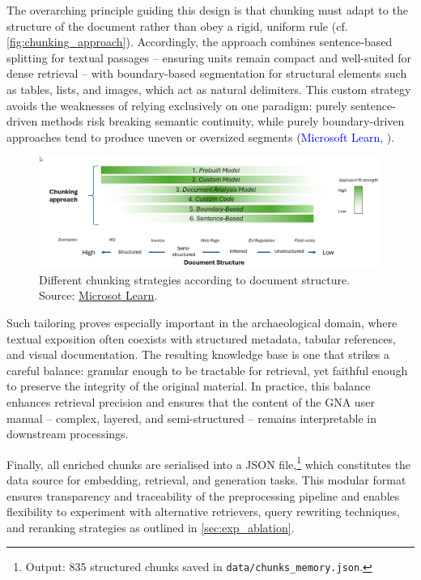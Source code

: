 \begin{spacing}{1.5}
The overarching principle guiding this design is that chunking must adapt to the structure of the document rather than obey a rigid, uniform rule (cf. \autoref{fig:chunking_approach}). Accordingly, the approach combines sentence-based splitting for textual passages -- ensuring units remain compact and well-suited for dense retrieval -- with boundary-based segmentation for structural elements such as tables, lists, and images, which act as natural delimiters. This custom strategy avoids the weaknesses of relying exclusively on one paradigm: purely sentence-driven methods risk breaking semantic continuity, while purely boundary-driven approaches tend to produce uneven or oversized segments (\textcolor{blue}{Microsoft Learn,} \citeyear{noauthor_develop_2025}).

\vspace{0.8em}
\begin{figure}[H]
  \centering
  \includegraphics[width=\textwidth]{images/chunking-approaches-by-document-structure.png} 
  \caption{Different chunking strategies according to document structure.\\
  \footnotesize{Source: \href{https://web.archive.org/web/20250825093743/https://learn.microsoft.com/en-us/azure/architecture/ai-ml/guide/rag/rag-chunking-phase}{Microsot Learn}}.}
  \label{fig:chunking_approach}
\end{figure}

Such tailoring proves especially important in the archaeological domain, where textual exposition often coexists with structured metadata, tabular references, and visual documentation. The resulting knowledge base is one that strikes a careful balance: granular enough to be tractable for retrieval, yet faithful enough to preserve the integrity of the original material. In practice, this balance enhances retrieval precision and ensures that the content of the GNA user manual -- complex, layered, and semi-structured -- remains interpretable in downstream processings.

Finally, all enriched chunks are serialised into a JSON file,\footnote{Output: 835 structured chunks saved in \texttt{data/chunks\_memory.json}.} which constitutes the data source for embedding, retrieval, and generation tasks. This modular format ensures transparency and traceability of the preprocessing pipeline and enables flexibility to experiment with alternative retrievers, query rewriting techniques, and reranking strategies as outlined in \autoref{sec:exp_ablation}.


\end{spacing}
